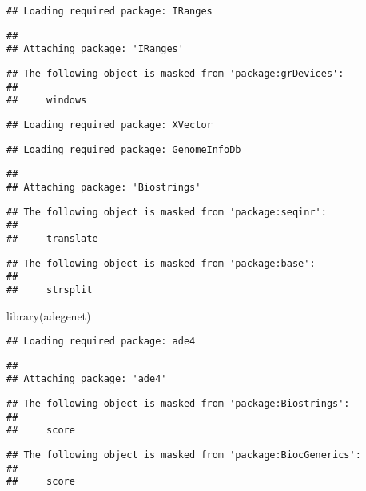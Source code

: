 \documentclass[
]{article}
\newenvironment{Shaded}{\begin{snugshade}}{\end{snugshade}}
\newcommand{\FunctionTok}[1]{\textcolor[rgb]{0.00,0.00,0.00}{#1}}
\newcommand{\NormalTok}[1]{#1}
\begin{document}
\begin{verbatim}
## Loading required package: IRanges
\end{verbatim}

\begin{verbatim}
## 
## Attaching package: 'IRanges'
\end{verbatim}

\begin{verbatim}
## The following object is masked from 'package:grDevices':
## 
##     windows
\end{verbatim}

\begin{verbatim}
## Loading required package: XVector
\end{verbatim}

\begin{verbatim}
## Loading required package: GenomeInfoDb
\end{verbatim}

\begin{verbatim}
## 
## Attaching package: 'Biostrings'
\end{verbatim}

\begin{verbatim}
## The following object is masked from 'package:seqinr':
## 
##     translate
\end{verbatim}

\begin{verbatim}
## The following object is masked from 'package:base':
## 
##     strsplit
\end{verbatim}

\begin{Shaded}
\begin{Highlighting}[]
\FunctionTok{library}\NormalTok{(adegenet)}
\end{Highlighting}
\end{Shaded}

\begin{verbatim}
## Loading required package: ade4
\end{verbatim}

\begin{verbatim}
## 
## Attaching package: 'ade4'
\end{verbatim}

\begin{verbatim}
## The following object is masked from 'package:Biostrings':
## 
##     score
\end{verbatim}

\begin{verbatim}
## The following object is masked from 'package:BiocGenerics':
## 
##     score
\end{verbatim}
\end{document}
